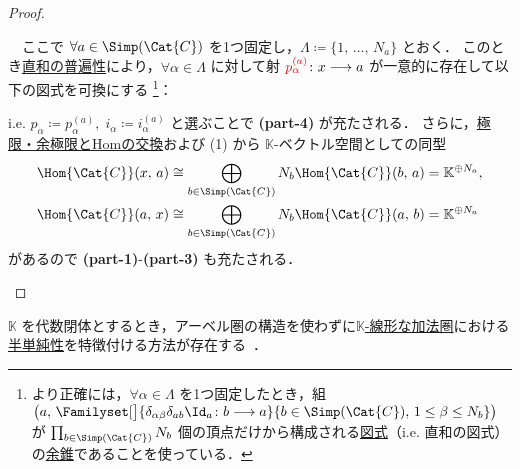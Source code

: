 \documentclass[TQFT_main]{subfiles}
\begin{document}
\begin{proof}
\begin{enumerate}
        　ここで $\forall a \in \Simp (\Cat{C})$ を1つ固定し，$\Lambda \coloneqq \{1,\, \dots,\, N_a\}$ とおく．
        このとき\hyperref[def:product-coproduct]{直和の普遍性}により，$\forall \alpha \in \Lambda$ に対して射 $\textcolor{red}{p^{(a)}_\alpha} \colon x \longrightarrow a$ が一意的に存在して以下の図式を可換にする
        \footnote{
            より正確には，$\forall \alpha \in \Lambda$ を1つ固定したとき，組 $\bigl(a,\, \Familyset[\big]{\delta_{\alpha\beta} \delta_{ab} \Id_a \colon b \lto a}{b \in \Simp(\Cat{C}),\, 1 \le \beta \le N_b} \bigr)$ が $\prod_{b \in \Simp(\Cat{C})} N_b$ 個の頂点だけから構成される\hyperref[def:diagram]{図式}（i.e. 直和の図式）の\hyperref[def:coCone]{余錐}であることを使っている．
        }：
        \begin{center}
        \end{center}
        i.e. $p_\alpha \coloneqq p^{(a)}_\alpha,\; i_\alpha \coloneqq i^{(a)}_\alpha$ と選ぶことで \textsf{\textbf{(part-4)}} が充たされる．
        さらに，\hyperref[prop:lim-colim-basic]{極限・余極限とHomの交換}および (1) から $\mathbb{K}$-ベクトル空間としての同型
        \begin{align}
            \Hom{\Cat{C}}(x,\, a) &\cong \bigoplus_{b \in \Simp(\Cat{C})} N_b \Hom{\Cat{C}}(b,\, a) = \mathbb{K}^{\oplus N_a}, \\
            \Hom{\Cat{C}}(a,\, x) &\cong \bigoplus_{b \in \Simp(\Cat{C})} N_b \Hom{\Cat{C}}(a,\, b) = \mathbb{K}^{\oplus N_a}
        \end{align}
        があるので \textsf{\textbf{(part-1)}}-\textsf{\textbf{(part-3)}} も充たされる．
    \end{enumerate}
\end{proof}

$\mathbb{K}$ を代数閉体とするとき，アーベル圏の構造を使わずに\hyperref[def:additive-cat]{$\mathbb{K}$-線形な加法圏}における\hyperref[def:semisimple]{半単純性}を特徴付ける方法が存在する~\cite[p.6]{Mueger2002subfactor}．
\end{document}
